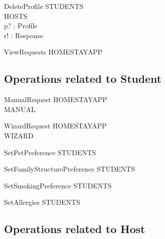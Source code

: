 \documentclass[11pt]{article}
\begin{document}
\begin{schema}{DeleteProfile}
	\Delta STUDENTS\\
	\Delta HOSTS\\
	p? : Profile\\
	r! : Response
\where
\end{schema}

\begin{schema}{ViewRequests}
	\Xi HOMESTAYAPP\\
\end{schema}


\subsection*{Operations related to Student}

\begin{schema}{ManualRequest}
	\Delta HOMESTAYAPP\\
	\Xi MANUAL


\end{schema}

\begin{schema}{WizardRequest}
	\Delta HOMESTAYAPP\\
	\Xi WIZARD\\

\end{schema}

\begin{schema}{SetPetPreference}
	\Delta STUDENTS\\
\end{schema}

\begin{schema}{SetFamilyStructurePreference}
	\Delta STUDENTS\\
\end{schema}

\begin{schema}{SetSmokingPreference}
	\Delta STUDENTS\\
\end{schema}

\begin{schema}{SetAllergies}
	\Delta STUDENTS\\
\end{schema}


\subsection*{Operations related to Host}
\end{document}
